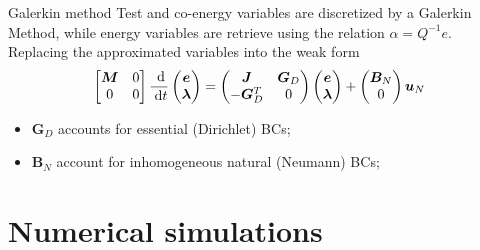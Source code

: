 \documentclass{beamer}
\begin{document}
\begin{frame}{Galerkin method}
Test and co-energy variables are discretized by a Galerkin Method, while energy variables are retrieve using the relation $\alpha = Q^{-1} e$. \\
 Replacing the approximated variables into the weak form 
\begin{equation*}
\begin{bmatrix}
\bm{M} & 0 \\
0      & 0 \\
\end{bmatrix} \frac{\d}{\d t}
\begin{pmatrix}
\bm{e}\\
\bm{\lambda} \\
\end{pmatrix}
= \begin{pmatrix}
\bm{J} & \bm{G}_D\\
-\bm{G}_D^T & 0 \\
\end{pmatrix}
\begin{pmatrix}
\bm{e}\\
\bm{\lambda} \\
\end{pmatrix} + 
\begin{pmatrix}
\bm{B}_N\\
0\\
\end{pmatrix}
\bm{u}_N
\end{equation*}
\begin{itemize}
\item $\bm{G}_D$ accounts for essential (Dirichlet) BCs;
\item $\bm{B}_N$ account for inhomogeneous natural (Neumann) BCs;
\end{itemize}
 
\end{frame}



\section{Numerical simulations}
\end{document}
